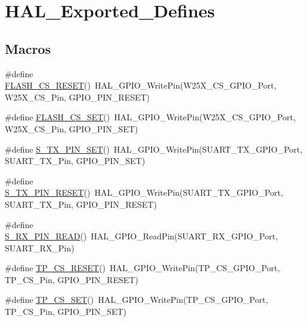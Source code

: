 \hypertarget{group___h_a_l___exported___defines}{}\section{H\+A\+L\+\_\+\+Exported\+\_\+\+Defines}
\label{group___h_a_l___exported___defines}
\subsection*{Macros}
\begin{DoxyCompactItemize}
\item 
\#define \mbox{\hyperlink{group___h_a_l___exported___defines_ga3df8c78e1d68d69f629630fb6095cec1}{F\+L\+A\+S\+H\+\_\+\+C\+S\+\_\+\+R\+E\+S\+ET}}()~H\+A\+L\+\_\+\+G\+P\+I\+O\+\_\+\+Write\+Pin(W25\+X\+\_\+\+C\+S\+\_\+\+G\+P\+I\+O\+\_\+\+Port, W25\+X\+\_\+\+C\+S\+\_\+\+Pin, G\+P\+I\+O\+\_\+\+P\+I\+N\+\_\+\+R\+E\+S\+ET)
\item 
\#define \mbox{\hyperlink{group___h_a_l___exported___defines_gadc9743a09abcf9e1d203bdd5081db24a}{F\+L\+A\+S\+H\+\_\+\+C\+S\+\_\+\+S\+ET}}()~H\+A\+L\+\_\+\+G\+P\+I\+O\+\_\+\+Write\+Pin(W25\+X\+\_\+\+C\+S\+\_\+\+G\+P\+I\+O\+\_\+\+Port, W25\+X\+\_\+\+C\+S\+\_\+\+Pin, G\+P\+I\+O\+\_\+\+P\+I\+N\+\_\+\+S\+ET)
\item 
\#define \mbox{\hyperlink{group___h_a_l___exported___defines_gac5645a8f806359e621559359dadfc7c5}{S\+\_\+\+T\+X\+\_\+\+P\+I\+N\+\_\+\+S\+ET}}()~H\+A\+L\+\_\+\+G\+P\+I\+O\+\_\+\+Write\+Pin(S\+U\+A\+R\+T\+\_\+\+T\+X\+\_\+\+G\+P\+I\+O\+\_\+\+Port, S\+U\+A\+R\+T\+\_\+\+T\+X\+\_\+\+Pin, G\+P\+I\+O\+\_\+\+P\+I\+N\+\_\+\+S\+ET)
\item 
\#define \mbox{\hyperlink{group___h_a_l___exported___defines_gadd41bc5ddcf6f842928efc4f0d944a57}{S\+\_\+\+T\+X\+\_\+\+P\+I\+N\+\_\+\+R\+E\+S\+ET}}()~H\+A\+L\+\_\+\+G\+P\+I\+O\+\_\+\+Write\+Pin(S\+U\+A\+R\+T\+\_\+\+T\+X\+\_\+\+G\+P\+I\+O\+\_\+\+Port, S\+U\+A\+R\+T\+\_\+\+T\+X\+\_\+\+Pin, G\+P\+I\+O\+\_\+\+P\+I\+N\+\_\+\+R\+E\+S\+ET)
\item 
\#define \mbox{\hyperlink{group___h_a_l___exported___defines_gac1fbe03efbe22feb97f198a4dd8b1237}{S\+\_\+\+R\+X\+\_\+\+P\+I\+N\+\_\+\+R\+E\+AD}}()~H\+A\+L\+\_\+\+G\+P\+I\+O\+\_\+\+Read\+Pin(S\+U\+A\+R\+T\+\_\+\+R\+X\+\_\+\+G\+P\+I\+O\+\_\+\+Port, S\+U\+A\+R\+T\+\_\+\+R\+X\+\_\+\+Pin)
\item 
\#define \mbox{\hyperlink{group___h_a_l___exported___defines_gab8f742cb77b6722531d6e265043768ee}{T\+P\+\_\+\+C\+S\+\_\+\+R\+E\+S\+ET}}()~H\+A\+L\+\_\+\+G\+P\+I\+O\+\_\+\+Write\+Pin(T\+P\+\_\+\+C\+S\+\_\+\+G\+P\+I\+O\+\_\+\+Port, T\+P\+\_\+\+C\+S\+\_\+\+Pin, G\+P\+I\+O\+\_\+\+P\+I\+N\+\_\+\+R\+E\+S\+ET)
\item 
\#define \mbox{\hyperlink{group___h_a_l___exported___defines_gaba8a54cd6e309557b45081d3fc38b141}{T\+P\+\_\+\+C\+S\+\_\+\+S\+ET}}()~H\+A\+L\+\_\+\+G\+P\+I\+O\+\_\+\+Write\+Pin(T\+P\+\_\+\+C\+S\+\_\+\+G\+P\+I\+O\+\_\+\+Port, T\+P\+\_\+\+C\+S\+\_\+\+Pin, G\+P\+I\+O\+\_\+\+P\+I\+N\+\_\+\+S\+ET)
\end{DoxyCompactItemize}


